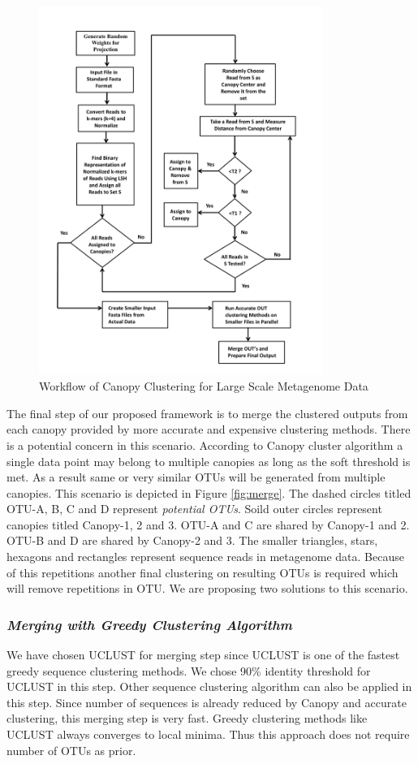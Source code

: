 \documentclass[10pt, conference, compsocconf]{IEEEtran}
\begin{document}
\begin{figure}
	\centering
	\includegraphics[width=\linewidth,height=12cm]{flowchart.png}	
	\caption{Workflow of Canopy Clustering for Large Scale Metagenome Data}
	\label{fig:flowchart}
\end{figure}

The final step of our proposed framework is to merge the clustered outputs from each canopy provided by more accurate and expensive clustering methods. There is a potential concern in this scenario. According to Canopy cluster algorithm a single data point may belong to multiple canopies as long as the soft threshold is met. As a result same or very similar OTUs will be generated from multiple canopies. This scenario is depicted in Figure \ref{fig:merge}. The dashed circles titled OTU-A, B, C and D represent \textit{potential OTUs}. Soild outer circles represent canopies titled Canopy-1, 2 and 3. OTU-A and C are shared by Canopy-1 and 2. OTU-B and D are shared by Canopy-2 and 3. The smaller triangles, stars, hexagons and rectangles represent sequence reads in metagenome data. Because of this repetitions another final clustering on resulting OTUs is required which will remove repetitions in OTU. We are proposing two solutions to this scenario.


\subsubsection{\textit{Merging with Greedy Clustering Algorithm}}
We have chosen UCLUST for merging step since UCLUST is one of the fastest greedy sequence clustering methods. We chose 90\% identity threshold for UCLUST in this step. Other sequence clustering algorithm can also be applied in this step. Since number of sequences is already reduced by Canopy and accurate clustering, this merging step is very fast. Greedy clustering methods like UCLUST always converges to local minima. Thus this approach does not require number of OTUs as prior. 
\end{document}
